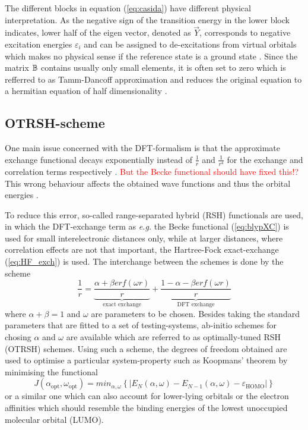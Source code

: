 The different blocks in equation (\ref{eq:casida}) have different physical interpretation.
As the negative sign of the transition energy in the lower block indicates, lower half of the eigen vector, denoted as $\vec{Y}$, corresponds to negative excitation energies $\varepsilon_i$ and can be assigned to de-excitations from virtual orbitals which makes no physical sense if the reference state is a ground state \cite{dreuw}.
Since the matrix $\mathbb{B}$ contains usually only small elements, it is often set to zero which is refferred to as Tamm-Dancoff approximation and reduces the original equation to a hermitian equation of half dimensionality \cite{casida}.

\subsection{OTRSH-scheme}
One main issue concerned with the DFT-formalism is that the approximate exchange functional decays exponentially instead of $\frac 1r$ and $\frac{1}{r^4}$ for the exchange and correlation terms respectively \cite{Bokareva}. \textcolor{red}{But the Becke functional should have fixed this!?}
This wrong behaviour affects the obtained wave functions and thus the orbital energies \cite{OT-RSH}.

To reduce this error, so-called range-separated hybrid (RSH) functionals are used, in which the DFT-exchange term as \textit{e.g.} the Becke functional (\ref{eq:blypXC}) is used for small interelectronic distances only, while at larger distances, where correlation effects are not that important, the Hartree-Fock exact-exchange (\ref{eq:HF_exch}) is used.
The interchange between the schemes is done by the scheme
\begin{equation}
   \frac 1r = \underbrace{\frac{\alpha +\beta erf(\omega r)}{r}}_{\text{exact exchange}} +\underbrace{\frac{1-\alpha-\beta erf(\omega r)}{r}}_{\text{DFT exchange}}
\end{equation}
where $\alpha+\beta=1$ and $\omega$ are parameters to be chosen.
Besides taking the standard parameters that are fitted to a set of testing-systems, ab-initio schemes for chosing $\alpha$ and $\omega$ are available which are referred to as optimally-tuned RSH (OTRSH) schemes.
Using such a scheme, the degrees of freedom obtained are used to optimise a particular system-property such as Koopmans' theorem by minimising the functional \cite{Bokareva}
\begin{equation}\label{eq:J_ao}
   J(\alpha_\text{opt},\omega_\text{opt})=min_{\alpha, \omega} \left\{ |E_N(\alpha,\omega)-E_{N-1}(\alpha,\omega)-\varepsilon_\text{HOMO}| \right\}
\end{equation}
or a similar one which can also account for lower-lying orbitals or the electron affinities which should resemble the binding energies of the lowest unoccupied molecular orbital (LUMO).


